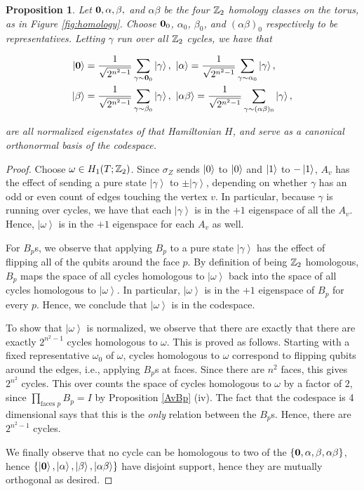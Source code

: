 \documentclass{article}
\newtheorem{proposition}{Proposition}[section]
\theoremstyle{definition}
\numberwithin{figure}{section}
\begin{document}
\begin{proposition}\label{basis} Let $\bold{0},\alpha,\beta,$ and $\alpha\beta$ be the four $\mathbb{Z}_2$ homology classes on the torus, as in Figure \ref{fig:homology}. Choose $\bold{0}_0$, $\alpha_0$, $\beta_0$, and $(\alpha\beta)_0$ respectively to be representatives. Letting $\gamma$ run over all $\mathbb{Z}_2$ cycles, we have that

\begin{align*}
\left|\bold{0}\right> &= \frac{1}{\sqrt{2^{n^2-1}}}\sum_{\gamma\sim \bold{0}_0}\left|\gamma\right>,\,\, \left|\alpha\right>=\frac{1}{\sqrt{2^{n^2-1}}}\sum_{\gamma\sim \alpha_0}\left|\gamma\right>,\\
\left|\beta\right> &= \frac{1}{\sqrt{2^{n^2-1}}}\sum_{\gamma\sim \beta_0}\left|\gamma\right>,\,\, \left|\alpha\beta\right>=\frac{1}{\sqrt{2^{n^2-1}}}\sum_{\gamma\sim (\alpha\beta)_0}\left|\gamma\right>,
\end{align*}

are all normalized eigenstates of that Hamiltonian $H$, and serve as a canonical orthonormal basis of the codespace.
\end{proposition}
\begin{proof} Choose $\omega\in H_1(T;\mathbb{Z}_2)$. Since $\sigma_Z$ sends $\left|0\right>$ to $\left|0\right>$ and $\left|1\right>$ to $-\left|1\right>$, $A_v$ has the effect of sending a pure state $\left|\gamma\right>$ to $\pm\left|\gamma\right>$, depending on whether $\gamma$ has an odd or even count of edges touching the vertex $v$. In particular, because $\gamma$ is running over cycles, we have that each $\left|\gamma\right>$ is in the $+1$ eigenspace of all the $A_v$. Hence, $\left|\omega\right>$ is in the $+1$ eigenspace for each $A_v$ as well.

For $B_p$s, we observe that applying $B_p$ to a pure state $\left|\gamma\right>$ has the effect of flipping all of the qubits around the face $p$. By definition of being $\mathbb{Z}_2$ homologous, $B_p$ maps the space of all cycles homologous to $\left|\omega\right>$ back into the space of all cycles homologous to $\left|\omega\right>$. In particular, $\left|\omega\right>$ is in the $+1$ eigenspace of $B_p$ for every $p$. Hence, we conclude that $\left|\omega\right>$ is in the codespace.

To show that $\left|\omega\right>$ is normalized, we observe that there are exactly that there are exactly $2^{n^2-1}$ cycles homologous to $\omega$. This is proved as follows. Starting with a fixed representative $\omega_0$ of $\omega$, cycles homologous to $\omega$ correspond to flipping qubits around the edges, i.e., applying $B_p$s at faces. Since there are $n^2$ faces, this gives $2^{n^2}$ cycles. This over counts the space of cycles homologous to $\omega$ by a factor of $2$, since $\prod_{\text{faces }p}B_p=I$ by Proposition \ref{AvBp} (iv). The fact that the codespace is 4 dimensional says that this is the \textit{only} relation between the $B_p$s. Hence, there are $2^{n^2-1}$ cycles.

We finally observe that no cycle can be homologous to two of the $\{\bold{0},\alpha,\beta,\alpha\beta\}$, hence $\left\{\left|\bold{0}\right>,\left|\alpha\right>,\left|\beta\right>,\left|\alpha\beta\right>\right\}$ have disjoint support, hence they are mutually orthogonal as desired.
\end{proof}
\end{document}
